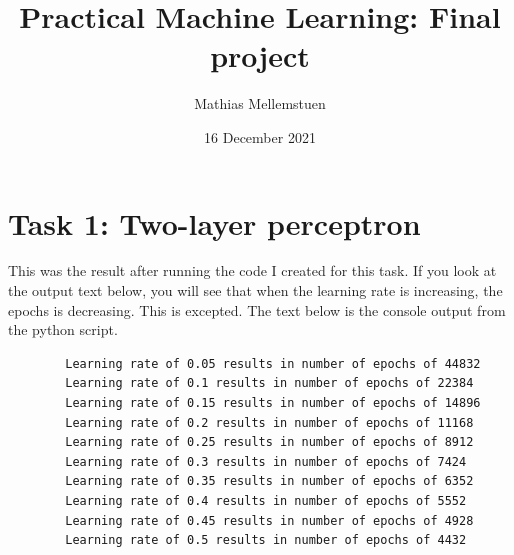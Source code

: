 \documentclass[titlepage, 11pt]{article}
\title{Practical Machine Learning: Final project }
\author{Mathias Mellemstuen}
\date{16 December 2021}
\begin{document}
    \maketitle

    \section{Task 1: Two-layer perceptron}
    This was the result after running the code I created for this task. If you look at the output text below, you will see that when the learning rate is increasing, the epochs is decreasing. This is excepted. \newline The text below is the console output from the python script.
    \begin{lstlisting}
        Learning rate of 0.05 results in number of epochs of 44832
        Learning rate of 0.1 results in number of epochs of 22384
        Learning rate of 0.15 results in number of epochs of 14896
        Learning rate of 0.2 results in number of epochs of 11168
        Learning rate of 0.25 results in number of epochs of 8912
        Learning rate of 0.3 results in number of epochs of 7424
        Learning rate of 0.35 results in number of epochs of 6352
        Learning rate of 0.4 results in number of epochs of 5552
        Learning rate of 0.45 results in number of epochs of 4928
        Learning rate of 0.5 results in number of epochs of 4432
    \end{lstlisting}
\end{document}
